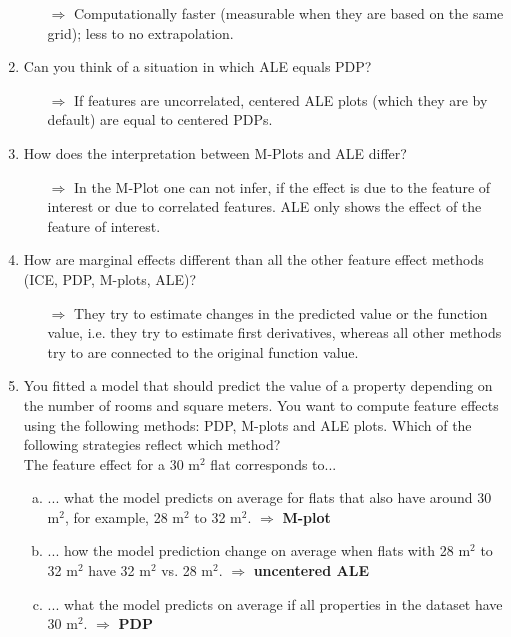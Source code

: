 \begin{enumerate}
\begin{itemize}
        \item[$\Rightarrow$] Computationally faster (measurable when they are based on the same grid); less to no extrapolation.
    \end{itemize}
    \item Can you think of a situation in which ALE equals PDP?
    \begin{itemize}
        \item[$\Rightarrow$] If features are uncorrelated, centered ALE plots (which they are by default) are equal to centered PDPs. 
    \end{itemize}
    \item How does the interpretation between M-Plots and ALE differ?
    \begin{itemize}
        \item[$\Rightarrow$] In the M-Plot one can not infer, if the effect is due to the feature of interest or due to correlated features. ALE only shows the effect of the feature of interest.
    \end{itemize}
    \item How are marginal effects different than all the other feature effect methods (ICE, PDP, M-plots, ALE)?
    \begin{itemize}
        \item[$\Rightarrow$] They try to estimate changes in the predicted value or the function value, i.e. they try to estimate first derivatives, whereas all other methods try to are connected to the original function value.
    \end{itemize}



    \item
    You fitted a model that should predict the value of a property depending on the number of rooms and square meters.
    You want to compute feature effects using the following methods: PDP, M-plots and ALE plots. 
    Which of the following strategies reflect which method? \\
    The feature effect for a 30 m$^2$ flat corresponds to... 
    \begin{enumerate}[a)]
        \item ... what the model predicts on average for flats that also have around 30 m$^2$, for example, 28 m$^2$ to 32 m$^2$. $\Rightarrow$ \textbf{M-plot}
        \item ... how the model prediction change on average when flats with 28 m$^2$ to 32 m$^2$ have 32 m$^2$ vs. 28 m$^2$. $\Rightarrow$ \textbf{uncentered ALE}
        \item ... what the model predicts on average if all properties in the dataset have 30 m$^2$. $\Rightarrow$ \textbf{PDP}
    \end{enumerate}

\end{enumerate}
